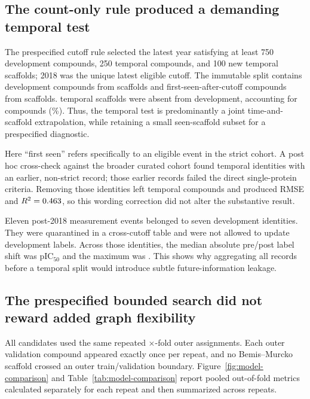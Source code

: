 \documentclass[11pt]{article}
\begin{document}
\subsection{The count-only rule produced a demanding temporal test}

The prespecified cutoff rule selected the latest year satisfying at least 750
development compounds, 250 temporal compounds, and 100 new temporal scaffolds;
2018 was the unique latest eligible cutoff. The immutable split contains
\DevelopmentCount{} development compounds from \DevelopmentScaffoldCount{}
scaffolds and \TemporalCount{} first-seen-after-cutoff compounds from
\TemporalScaffoldCount{} scaffolds. \NewTemporalScaffoldCount{} temporal
scaffolds were absent from development, accounting for
\NewTemporalCompoundCount{} compounds (\NewTemporalCompoundPercent{}\%). Thus,
the temporal test is predominantly a joint time-and-scaffold extrapolation, while
retaining a small seen-scaffold subset for a prespecified diagnostic.

Here ``first seen'' refers specifically to an eligible event in the strict
cohort. A post hoc cross-check against the broader curated cohort found
\EarlierBroadRecordCount{} temporal identities with an earlier, non-strict
record; those earlier records failed the direct single-protein criteria. Removing
those identities left \StrictChronologySensitivityCount{} temporal compounds and
produced RMSE \StrictChronologySensitivityRMSE{} and
$R^2=0.463{}$, so this wording correction did not alter
the substantive result.

Eleven post-2018 measurement events belonged to seven development identities.
They were quarantined in a cross-cutoff table and were not allowed to update
development labels. Across those identities, the median absolute pre/post label
shift was \CrossCutoffMedianShift{} pIC$_{50}$ and the maximum was
\CrossCutoffMaximumShift{}. This shows why aggregating all records before a
temporal split would introduce subtle future-information leakage.

\subsection{The prespecified bounded search did not reward added graph flexibility}

All candidates used the same \OuterRepeatCount{} repeated
\(\times\)\OuterFoldCount{}-fold outer assignments. Each outer validation
compound appeared exactly once per repeat, and no Bemis--Murcko scaffold crossed
an outer train/validation boundary. Figure~\ref{fig:model-comparison} and
Table~\ref{tab:model-comparison} report pooled out-of-fold metrics calculated
separately for each repeat and then summarized across repeats.
\end{document}
